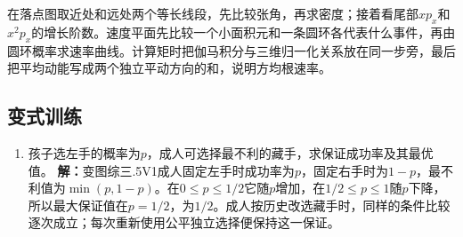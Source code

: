 \documentclass[UTF8,fontset=fandol,a4paper,11pt]{ctexart}
\begin{document}
在落点图取近处和远处两个等长线段，先比较张角，再求密度；接着看尾部$x p_x$和$x^2p_x$的增长阶数。速度平面先比较一个小面积元和一条圆环各代表什么事件，再由圆环概率求速率曲线。计算矩时把伽马积分与三维归一化关系放在同一步旁，最后把平均动能写成两个独立平动方向的和，说明方均根速率。



\subsection*{变式训练}

\begin{enumerate}
\item 孩子选左手的概率为$p$，成人可选择最不利的藏手，求保证成功率及其最优值。
\textbf{解：}变图综三.5V1成人固定左手时成功率为$p$，固定右手时为$1-p$，最不利值为$\min(p,1-p)$。在$0\le p\le1/2$它随$p$增加，在$1/2\le p\le1$随$p$下降，所以最大保证值在$p=1/2$，为$1/2$。成人按历史改选藏手时，同样的条件比较逐次成立；每次重新使用公平独立选择便保持这一保证。
\begin{center}\begin{minipage}{.98\linewidth}\centering
{}
\end{minipage}
\end{center}
\end{enumerate}
\end{document}
